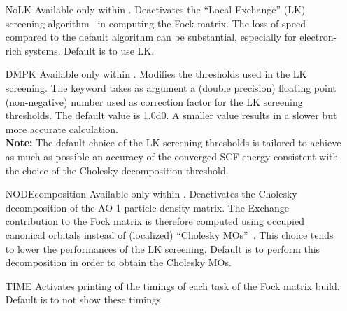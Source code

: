\begin{keywordlist}
\begin{itemize}
\item[NoLK]
Available only within . Deactivates the ``Local Exchange'' (LK) screening algorithm~\cite{Aquilante:07a} in computing
the Fock matrix. The loss of speed compared to the default algorithm can be substantial, especially for electron-rich systems.
Default is to use LK.
\item[DMPK]
Available only within . Modifies the thresholds used in the LK screening.
The keyword takes as argument a (double precision) floating point (non-negative) number used
as correction factor for the LK screening thresholds.
The default value is 1.0d0. A smaller value results in a slower but more accurate calculation.\\
{\bf Note:} The default choice of the LK screening thresholds is tailored to achieve as much as possible an
accuracy of the converged SCF energy consistent with the choice of the Cholesky decomposition
threshold.
\item[NODEcomposition]
Available only within . Deactivates the Cholesky decomposition of the AO 1-particle density matrix.
The Exchange contribution to the Fock matrix is therefore computed using occupied canonical orbitals
instead of (localized) ``Cholesky MOs''~\cite{Aquilante:06a}. This choice tends to lower the performances of the
LK screening.
Default is to perform this decomposition in order to obtain the Cholesky MOs.
\item[TIME]
Activates printing of the timings of each task of the Fock matrix build.
Default is to not show these timings.

\end{itemize}
\end{keywordlist}
